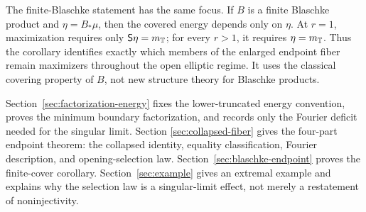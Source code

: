 The finite-Blaschke statement has the same focus.  If \(B\) is a finite
Blaschke product and \(\eta=B_\ast\mu\), then the covered energy depends
only on \(\eta\).  At \(r=1\), maximization requires only
\(\mathsf S\eta=m_{\mathbb{T}}\); for every \(r>1\), it requires
\(\eta=m_{\mathbb{T}}\).  Thus the corollary identifies exactly which members
of the enlarged endpoint fiber remain maximizers throughout the open
elliptic regime.  It uses the classical covering property of \(B\), not
new structure theory for Blaschke products.

Section~\ref{sec:factorization-energy} fixes the lower-truncated energy
convention, proves the minimum boundary factorization, and records only
the Fourier deficit needed for the singular limit.  Section
\ref{sec:collapsed-fiber} gives the four-part endpoint theorem: the
collapsed identity, equality classification, Fourier description, and
opening-selection law.  Section~\ref{sec:blaschke-endpoint} proves the
finite-cover corollary.  Section~\ref{sec:example} gives an extremal
example and explains why the selection law is a singular-limit effect,
not merely a restatement of noninjectivity.
